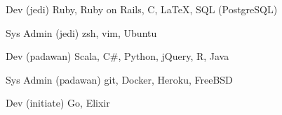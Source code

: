 
\begin{cvskills}

  \cvskill
    {Dev (jedi)} %
    {Ruby, Ruby on Rails, C, LaTeX, SQL (PostgreSQL)} %

  \cvskill
    {Sys Admin (jedi)} %
    {zsh, vim, Ubuntu} %

  \cvskill
    {Dev (padawan)} %
    {Scala, C\#, Python, jQuery, R, Java} %

  \cvskill
    {Sys Admin (padawan)} %
    {git, Docker, Heroku, FreeBSD} %

  \cvskill
    {Dev (initiate)} %
    {Go, Elixir} %
\end{cvskills}
